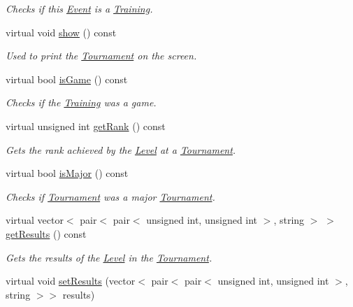 \begin{DoxyCompactItemize}
\begin{DoxyCompactList}\small\item\em Checks if this \hyperlink{class_event}{Event} is a \hyperlink{class_training}{Training}. \end{DoxyCompactList}\item 
virtual void \hyperlink{class_tournament_a35bd5292194edb5d5c220838b68cda75}{show} () const
\begin{DoxyCompactList}\small\item\em Used to print the \hyperlink{class_tournament}{Tournament} on the screen. \end{DoxyCompactList}\item 
virtual bool \hyperlink{class_tournament_a62adb322a6d5268d4ec3e267570ff4ed}{is\+Game} () const
\begin{DoxyCompactList}\small\item\em Checks if the \hyperlink{class_training}{Training} was a game. \end{DoxyCompactList}\item 
virtual unsigned int \hyperlink{class_tournament_ae021dc9d9aa7fb8b18bd065bfccc4b7e}{get\+Rank} () const
\begin{DoxyCompactList}\small\item\em Gets the rank achieved by the \hyperlink{class_level}{Level} at a \hyperlink{class_tournament}{Tournament}. \end{DoxyCompactList}\item 
virtual bool \hyperlink{class_tournament_af733baa05b3ae1465d6b5271929b5061}{is\+Major} () const
\begin{DoxyCompactList}\small\item\em Checks if \hyperlink{class_tournament}{Tournament} was a major \hyperlink{class_tournament}{Tournament}. \end{DoxyCompactList}\item 
virtual vector$<$ pair$<$ pair$<$ unsigned int, unsigned int $>$, string $>$ $>$ \hyperlink{class_tournament_abacd2d5489099f31a9688a7da4d64c40}{get\+Results} () const
\begin{DoxyCompactList}\small\item\em Gets the results of the \hyperlink{class_level}{Level} in the \hyperlink{class_tournament}{Tournament}. \end{DoxyCompactList}\item 
virtual void \hyperlink{class_tournament_acab9ee32169ba590f4ffdb5b59b28a86}{set\+Results} (vector$<$ pair$<$ pair$<$ unsigned int, unsigned int $>$, string $>$$>$ results)
$$
\end{DoxyCompactItemize}
